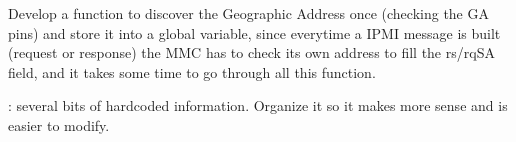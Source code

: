 
\begin{DoxyRefList}
\item[\label{todo__todo000001}%
\hypertarget{todo__todo000001}{}%
Global \hyperlink{ipmb_8h_a1c987a2dc56422b57146391280f5e796}{get\-\_\-ipmb\-\_\-addr} (void)]Develop a function to discover the Geographic Address once (checking the G\-A pins) and store it into a global variable, since everytime a I\-P\-M\-I message is built (request or response) the M\-M\-C has to check its own address to fill the rs/rq\-S\-A field, and it takes some time to go through all this function.  
\item[\label{todo__todo000002}%
\hypertarget{todo__todo000002}{}%
Global \hyperlink{ipmi_8c_ab560cc7a3b9a9264296f742d63b1283a}{I\-P\-M\-I\-\_\-\-H\-A\-N\-D\-L\-E\-R} (ipmi\-\_\-get\-\_\-device\-\_\-id, N\-E\-T\-F\-N\-\_\-\-A\-P\-P, I\-P\-M\-I\-\_\-\-G\-E\-T\-\_\-\-D\-E\-V\-I\-C\-E\-\_\-\-I\-D\-\_\-\-C\-M\-D, \hyperlink{structipmi__msg}{ipmi\-\_\-msg} $\ast$req, \hyperlink{structipmi__msg}{ipmi\-\_\-msg} $\ast$rsp)]\-: several bits of hardcoded information. Organize it so it makes more sense and is easier to modify. 
\end{DoxyRefList}